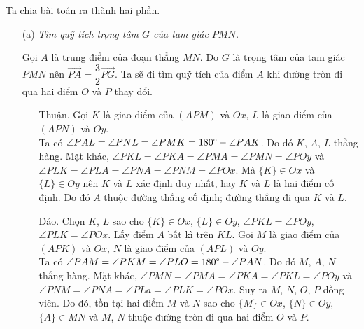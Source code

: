         \begin{solution}
            Ta chia bài toán ra thành hai phần.
            
            \begin{enumerate}
            
                \item[(a)] \textit{Tìm quỹ tích trọng tâm \(G\) của tam giác \(PMN\).}

                Gọi \(A\) là trung điểm của đoạn thẳng \(MN\). Do \(G\) là trọng tâm của tam giác \(PMN\) nên \(\overrightarrow{PA} = \dfrac{3}{2}\overrightarrow{PG}\). Ta sẽ đi tìm quỹ tích của điểm \(A\) khi đường tròn đi qua hai điểm \(O\) và \(P\) thay đổi.

                \begin{enumerate}[leftmargin=1.25cm]
                
                    \item[Thuận.] Gọi \(K\) là giao điểm của \((APM)\) và \(Ox\), \(L\) là giao điểm của \((APN)\) và \(Oy\).\\
                    Ta có \(\angle PAL = \angle PNL = \angle PMK = 180 \degree - \angle PAK\). Do đó \(K\), \(A\), \(L\) thẳng hàng. Mặt khác, \(\angle PKL = \angle PKA = \angle PMA = \angle PMN = \angle POy\) và \(\angle PLK = \angle PLA = \angle PNA = \angle PNM = \angle POx\). Mà \(\{K\} \in Ox\) và \(\{L\} \in Oy\) nên \(K\) và \(L\) xác định duy nhất, hay \(K\) và \(L\) là hai điểm cố định. Do đó \(A\) thuộc đường thẳng cố định; đường thẳng đi qua \(K\) và \(L\).

                    \item[Đảo.] Chọn \(K\), \(L\) sao cho \(\{K\} \in Ox\), \(\{L\} \in Oy\), \(\angle PKL = \angle POy\), \(\angle PLK = \angle POx\). Lấy điểm \(A\) bất kì trên \(KL\). Gọi \(M\) là giao điểm của \((APK)\) và \(Ox\), \(N\) là giao điểm của \((APL)\) và \(Oy\).\\
                    Ta có \(\angle PAM = \angle PKM = \angle PLO = 180 \degree - \angle PAN\). Do đó \(M\), \(A\), \(N\) thẳng hàng. Mặt khác, \(\angle PMN = \angle PMA = \angle PKA = \angle PKL = \angle POy\) và \(\angle PNM = \angle PNA = \angle PLa = \angle PLK = \angle POx\). Suy ra \(M\), \(N\), \(O\), \(P\) đồng viên. Do đó, tồn tại hai điểm \(M\) và \(N\) sao cho \(\{M\} \in Ox\), \(\{N\} \in Oy\), \(\{A\} \in MN\) và \(M\), \(N\) thuộc đường tròn đi qua hai điểm \(O\) và \(P\).
                
                \end{enumerate}


\end{enumerate}
\end{solution}
